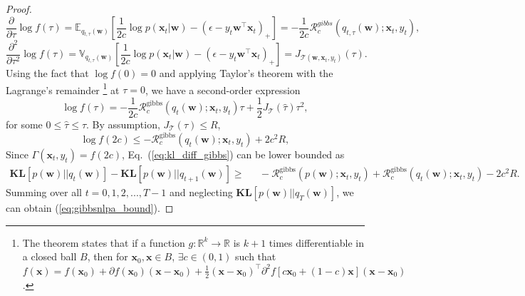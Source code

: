 \documentclass[twoside,11pt]{article}
\newcommand{\xv}{\bm{x}}
\newcommand{\regret}{\mathcal{R}}
\newcommand{\wv}{\bm{w}}
\newcommand{\eat}[1]{}
\newcommand{\KL}{\textbf{KL}}
\newcommand{\var}{\mathbb{V}}
\newcommand{\real}{\mathbb{R}}
\newcommand{\E}{\mathbb{E}}
\begin{document}
{\begin{proof}
\begin{equation*}
\frac{\partial}{\partial \tau} \log  f(\tau) = \E_{q_{t, \tau}(\wv)}\left[\frac{1}{2c} \log p(\xv_t | \wv) - \left(\epsilon-y_t \wv^\top \xv_t\right)_{+}\right] = -\frac{1}{2c}\regret_c^{gibbs}(q_{t,\tau}(\wv); \xv_t, y_t),
\end{equation*}
\begin{equation*}
\frac{\partial^2}{\partial \tau^2} \log  f(\tau) = \var_{q_{t, \tau}(\wv)}\left[\frac{1}{2c} \log p(\xv_t | \wv)-\left(\epsilon-y_t \wv^\top \xv_t\right)_{+} \right] = J_{\mathcal{T}(\wv, \xv_t, y_t)}(\tau).
\end{equation*}
Using the fact that $\log  f(0) = 0$ and applying Taylor's theorem with the Lagrange's remainder \footnote{The theorem states that if a function $g: \real^k \rightarrow \real$ is $k+1$ times differentiable in a closed ball $B$, then for $\xv_0, \xv \in B$,  $\exists c \in (0,1)$ such that $f(\xv) = f(\xv_0)+\partial f(\xv_0)(\xv-\xv_0)+\frac{1}{2}(\xv-\xv_0)^\top \partial^2 f[c \xv_0+(1-c) \xv] (\xv-\xv_0)$.} at $\tau = 0$, we have a second-order expression
\begin{equation*}
\log  f(\tau) = -\frac{1}{2c}  \regret_c^\text{gibbs}(q_t(\wv); \xv_t, y_t) \tau + \frac{1}{2} J_{\mathcal{T}}(\hat{\tau}) \tau^2,
\end{equation*}
for some $0 \leq \hat{\tau} \leq \tau$. By assumption, $J_{\mathcal{T}}(\hat{\tau})  \leq R$,
\begin{equation*}
\log  f(2c) \leq  - \regret_c^\text{gibbs}(q_t(\wv); \xv_t, y_t) + 2 c^2 R ,
\end{equation*}
Since $\Gamma(\xv_t, y_t) = f(2c)$, Eq.~(\ref{eq:kl_diff_gibbs}) can be lower bounded as
\begin{eqnarray*}
\KL[p(\wv) || q_{t}(\wv)]-\KL[p(\wv) || q_{t+1}(\wv)]  \geq &~~~ -\regret_c^\text{gibbs}(p(\wv); \xv_t, y_t)+\regret_c^\text{gibbs}(q_t(\wv); \xv_t, y_t)-2 c^2 R .
\end{eqnarray*}
Summing over all $t = 0, 1, 2, ..., T-1$ and neglecting $\KL[p(\wv) || q_{T}(\wv)]$, we can obtain (\ref{eq:gibbsnlpa_bound}).
\end{proof}
\fi



}
\end{document}
